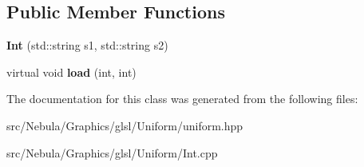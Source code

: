 \subsection*{\-Public \-Member \-Functions}
\begin{DoxyCompactItemize}
\item 
\hypertarget{classNeb_1_1glsl_1_1Uniform_1_1Vector_1_1Int_a48b39d8547200b58574b24e47a921979}{{\bfseries \-Int} (std\-::string s1, std\-::string s2)}\label{classNeb_1_1glsl_1_1Uniform_1_1Vector_1_1Int_a48b39d8547200b58574b24e47a921979}

\item 
\hypertarget{classNeb_1_1glsl_1_1Uniform_1_1Vector_1_1Int_aced65097bbb181aaf0d8ebdbbf23dfba}{virtual void {\bfseries load} (int, int)}\label{classNeb_1_1glsl_1_1Uniform_1_1Vector_1_1Int_aced65097bbb181aaf0d8ebdbbf23dfba}

\end{DoxyCompactItemize}


\-The documentation for this class was generated from the following files\-:\begin{DoxyCompactItemize}
\item 
src/\-Nebula/\-Graphics/glsl/\-Uniform/uniform.\-hpp\item 
src/\-Nebula/\-Graphics/glsl/\-Uniform/\-Int.\-cpp\end{DoxyCompactItemize}
